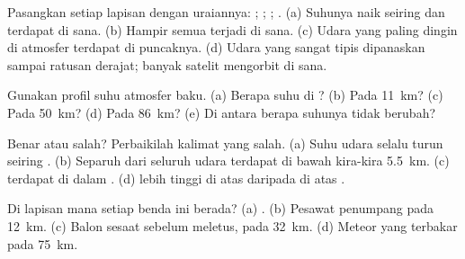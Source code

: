 \begin{exercise}[$\star$]\label{exo:g8:the-atmosphere:1}
Pasangkan setiap lapisan dengan uraiannya: ; ; ;
. (a) Suhunya naik seiring  dan  terdapat di
sana. (b) Hampir semua  terjadi di sana. (c) Udara yang paling dingin
di atmosfer terdapat di puncaknya. (d) Udara yang sangat tipis dipanaskan
sampai ratusan derajat; banyak satelit mengorbit di sana.
\end{exercise}

\begin{exercise}[$\star$]\label{exo:g8:the-atmosphere:2}
Gunakan profil suhu atmosfer baku. (a) Berapa suhu di ?
(b) Pada \qty{11}{km}? (c) Pada \qty{50}{km}? (d) Pada \qty{86}{km}?
(e) Di antara  berapa suhunya tidak berubah?
\end{exercise}

\begin{exercise}[$\star$]\label{exo:g8:the-atmosphere:3}
Benar atau salah? Perbaikilah kalimat yang salah. (a) Suhu udara selalu
turun seiring . (b) Separuh dari seluruh udara terdapat di bawah
kira-kira \qty{5.5}{km}. (c)  terdapat di dalam .
(d)  lebih tinggi di atas  daripada di atas .
\end{exercise}

\begin{exercise}[$\star$]\label{exo:g8:the-atmosphere:4}
Di lapisan mana setiap benda ini berada? (a)  . (b) Pesawat
penumpang pada  \qty{12}{km}. (c) Balon  sesaat sebelum
meletus, pada \qty{32}{km}. (d) Meteor yang terbakar pada \qty{75}{km}.
\end{exercise}

